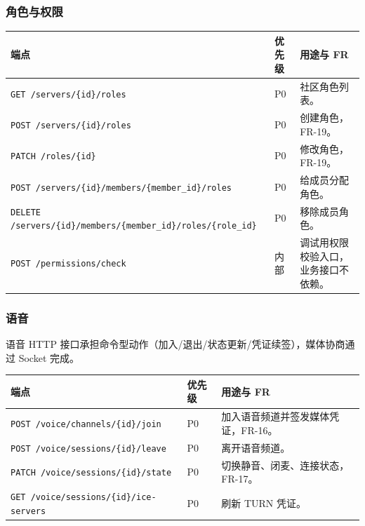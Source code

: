 \subsubsection{角色与权限}

\noindent\begin{tabularx}{\textwidth}{L{6.6cm}L{2.2cm}Y}
  \toprule
  端点 & 优先级 & 用途与 FR \\
  \midrule
  \texttt{GET /servers/\{id\}/roles} & P0 & 社区角色列表。 \\
  \texttt{POST /servers/\{id\}/roles} & P0 & 创建角色，FR-19。 \\
  \texttt{PATCH /roles/\{id\}} & P0 & 修改角色，FR-19。 \\
  \texttt{POST /servers/\{id\}/members/\{member\_id\}/roles} & P0 & 给成员分配角色。 \\
  \texttt{DELETE /servers/\{id\}/members/\{member\_id\}/roles/\{role\_id\}} & P0 & 移除成员角色。 \\
  \texttt{POST /permissions/check} & 内部 & 调试用权限校验入口，业务接口不依赖。 \\
  \bottomrule
\end{tabularx}

\subsubsection{语音}

语音 HTTP 接口承担命令型动作（加入/退出/状态更新/凭证续签），媒体协商通过 Socket 完成。

\noindent\begin{tabularx}{\textwidth}{L{6.4cm}L{2.2cm}Y}
  \toprule
  端点 & 优先级 & 用途与 FR \\
  \midrule
  \texttt{POST /voice/channels/\{id\}/join} & P0 & 加入语音频道并签发媒体凭证，FR-16。 \\
  \texttt{POST /voice/sessions/\{id\}/leave} & P0 & 离开语音频道。 \\
  \texttt{PATCH /voice/sessions/\{id\}/state} & P0 & 切换静音、闭麦、连接状态，FR-17。 \\
  \texttt{GET /voice/sessions/\{id\}/ice-servers} & P0 & 刷新 TURN 凭证。 \\
  \bottomrule
\end{tabularx}


